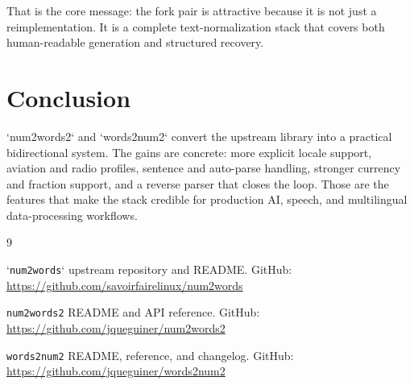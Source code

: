 \documentclass{article}
\begin{document}
That is the core message: the fork pair is attractive because it is not just a
reimplementation. It is a complete text-normalization stack that covers both
human-readable generation and structured recovery.

\section{Conclusion}
`num2words2` and `words2num2` convert the upstream library into a practical
bidirectional system. The gains are concrete: more explicit locale support,
aviation and radio profiles, sentence and auto-parse handling, stronger
currency and fraction support, and a reverse parser that closes the loop.
Those are the features that make the stack credible for production AI, speech,
and multilingual data-processing workflows.

\begin{thebibliography}{9}

`\texttt{num2words}` upstream repository and README. GitHub:
\url{https://github.com/savoirfairelinux/num2words}

\texttt{num2words2} README and API reference. GitHub:
\url{https://github.com/jqueguiner/num2words2}

\texttt{words2num2} README, reference, and changelog. GitHub:
\url{https://github.com/jqueguiner/words2num2}

\end{thebibliography}
\end{document}
